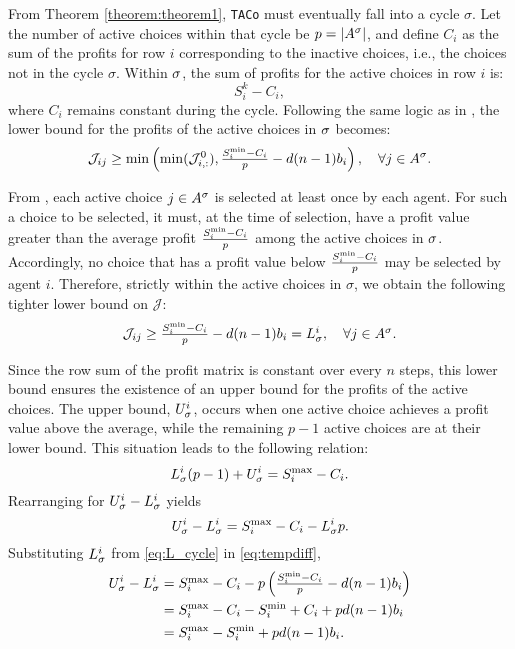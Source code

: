 \begin{customproof}
From Theorem \ref{theorem:theorem1}, \texttt{TACo} must eventually fall into a cycle $\sigma$. 
Let the number of active choices within that cycle be $p = |A^\sigma|$, and define $C_i$ as the sum of the profits for row $i$ corresponding to the inactive choices, i.e., the choices not in the cycle $\sigma$. Within $\sigma$, the sum of profits for the active choices in row $i$ is:
\begin{equation}
S_i^k - C_i,
\end{equation}
where $C_i$ remains constant during the cycle. Following the same logic as in , the lower bound for the profits of the active choices in $\sigma$ becomes:
\begin{equation}
\mathcal{J}_{ij} \geq \min\left(\min(\mathcal{J}_{i,:}^{\text{0}}), \textstyle{\frac{S_i^{\mathrm{min}}- C_i}{p}} - d(n-1)b_i\right), \quad \forall j \in A^\sigma.
\end{equation}

From , each active choice $j \in A^\sigma$ is selected at least once by each agent. For such a choice to be selected, it must,  at the time of selection, have a profit value greater than the average profit $\frac{S_i^{\mathrm{min}} - C_i}{p}$ among the active choices in $\sigma$. Accordingly, no choice that has a profit value below $\frac{S_i^{\mathrm{min}} - C_i}{p}$ may be selected by agent $i$. Therefore, strictly within the active choices in $\sigma$, we obtain the following tighter lower bound on $\mathcal{J}$:
\begin{equation} \label{eq:L_cycle}
\mathcal{J}_{ij} \geq \textstyle{\frac{S_i^{\mathrm{min}}- C_i}{p}} - d(n-1)b_i = L_\sigma^i, \quad \forall j \in A^\sigma.
\end{equation}

Since the row sum of the profit matrix is constant over every $n$ steps, this lower bound ensures the existence of an upper bound for the profits of the active choices. The upper bound, $U_\sigma^i$, occurs when one active choice achieves a profit value above the average, while the remaining $p-1$ active choices are at their lower bound. This situation leads to the following relation:
\begin{equation}
L_\sigma^i (p-1) + U_\sigma^i = S_i^{\mathrm{max}} - C_i.
\end{equation}
Rearranging for $U_\sigma^i-L_\sigma^i$ yields
\begin{equation}\label{eq:tempdiff}
U_\sigma^i - L_\sigma^i = S_i^{\mathrm{max}} - C_i  - L_\sigma^i p.
\end{equation}
Substituting $L_\sigma^i$  from \cref{eq:L_cycle} in \eqref{eq:tempdiff},
\begin{align}
U_\sigma^i - L_\sigma^i &= \textstyle{S_i^{\mathrm{max}}- C_i - p\left(\frac{S_i^{\mathrm{min}}- C_i}{p} - d(n-1)b_i \right)} \\
&= S_i^{\mathrm{max}} - C_i - S_i^{\mathrm{min}} + C_i + p d(n-1)b_i\\
&= S_i^{\mathrm{max}} - S_i^{\mathrm{min}} + p d(n-1)b_i.
\end{align}


\end{customproof}
